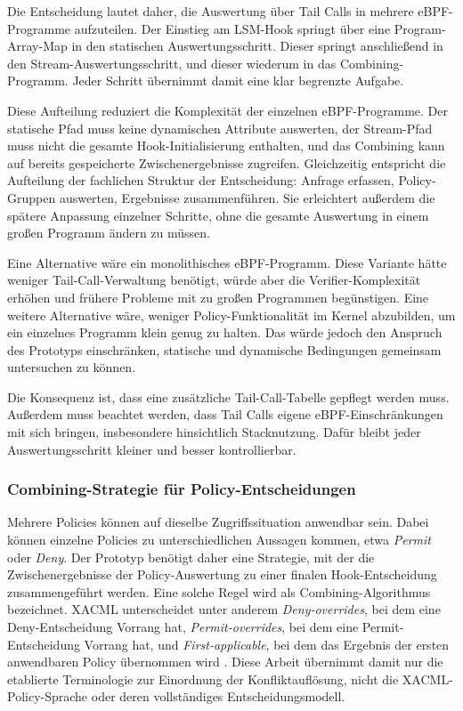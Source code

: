 Die Entscheidung lautet daher, die Auswertung über Tail Calls in mehrere eBPF-Programme aufzuteilen.
Der Einstieg am LSM-Hook springt über eine Program-Array-Map in den statischen Auswertungsschritt.
Dieser springt anschließend in den Stream-Auswertungsschritt, und dieser wiederum in das Combining-Programm.
Jeder Schritt übernimmt damit eine klar begrenzte Aufgabe.

Diese Aufteilung reduziert die Komplexität der einzelnen eBPF-Programme.
Der statische Pfad muss keine dynamischen Attribute auswerten, der Stream-Pfad muss nicht die gesamte Hook-Initialisierung enthalten, und das Combining kann auf bereits gespeicherte Zwischenergebnisse zugreifen.
Gleichzeitig entspricht die Aufteilung der fachlichen Struktur der Entscheidung: Anfrage erfassen, Policy-Gruppen auswerten, Ergebnisse zusammenführen.
Sie erleichtert außerdem die spätere Anpassung einzelner Schritte, ohne die gesamte Auswertung in einem großen Programm ändern zu müssen.

Eine Alternative wäre ein monolithisches eBPF-Programm.
Diese Variante hätte weniger Tail-Call-Verwaltung benötigt, würde aber die Verifier-Komplexität erhöhen und frühere Probleme mit zu großen Programmen begünstigen.
Eine weitere Alternative wäre, weniger Policy-Funktionalität im Kernel abzubilden, um ein einzelnes Programm klein genug zu halten.
Das würde jedoch den Anspruch des Prototyps einschränken, statische und dynamische Bedingungen gemeinsam untersuchen zu können.

Die Konsequenz ist, dass eine zusätzliche Tail-Call-Tabelle gepflegt werden muss.
Außerdem muss beachtet werden, dass Tail Calls eigene eBPF-Einschränkungen mit sich bringen, insbesondere hinsichtlich Stacknutzung.
Dafür bleibt jeder Auswertungsschritt kleiner und besser kontrollierbar.

\subsubsection{Combining-Strategie für Policy-Entscheidungen}\label{sec:combining-konzept}
Mehrere Policies können auf dieselbe Zugriffssituation anwendbar sein.
Dabei können einzelne Policies zu unterschiedlichen Aussagen kommen, etwa \textit{Permit} oder \textit{Deny}.
Der Prototyp benötigt daher eine Strategie, mit der die Zwischenergebnisse der Policy-Auswertung zu einer finalen Hook-Entscheidung zusammengeführt werden.
Eine solche Regel wird als Combining-Algorithmus bezeichnet. XACML unterscheidet unter anderem
\textit{Deny-overrides}, bei dem eine Deny-Entscheidung Vorrang hat, \textit{Permit-overrides}, bei
dem eine Permit-Entscheidung Vorrang hat, und \textit{First-applicable}, bei dem das Ergebnis der
ersten anwendbaren Policy übernommen wird \citep{oasisXacml30}. Diese Arbeit übernimmt damit nur
die etablierte Terminologie zur Einordnung der Konfliktauflösung, nicht die XACML-Policy-Sprache
oder deren vollständiges Entscheidungsmodell.

